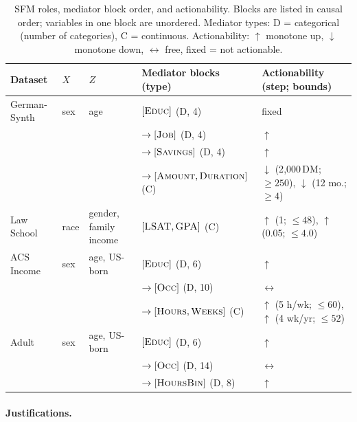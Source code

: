 \begin{table}[t]
\centering
\small
\caption{SFM roles, mediator block order, and actionability. Blocks are
listed in causal order; variables in one block are unordered. Mediator types:
D = categorical (number of categories), C = continuous. Actionability:
$\uparrow$ monotone up, $\downarrow$ monotone down, $\leftrightarrow$ free,
fixed = not actionable.}
\label{tab:roles}
\begin{tabular}{lllll}
\hline
Dataset & $X$ & $Z$ & Mediator blocks (type) & Actionability (step; bounds) \\
\hline
German-Synth & sex & age &
  $[\textsc{Educ}]$ (D, 4) & fixed \\
& & & $\to[\textsc{Job}]$ (D, 4) & $\uparrow$ \\
& & & $\to[\textsc{Savings}]$ (D, 4) & $\uparrow$ \\
& & & $\to[\textsc{Amount},\textsc{Duration}]$ (C) &
  $\downarrow$ (2{,}000\,DM; $\ge250$), $\downarrow$ (12 mo.; $\ge4$) \\
\hline
Law School & race & gender, family income &
  $[\textsc{LSAT},\textsc{GPA}]$ (C) & $\uparrow$ (1; $\le48$), $\uparrow$ (0.05; $\le4.0$) \\
\hline
ACS Income & sex & age, US-born &
  $[\textsc{Educ}]$ (D, 6) & $\uparrow$ \\
& & & $\to[\textsc{Occ}]$ (D, 10) & $\leftrightarrow$ \\
& & & $\to[\textsc{Hours},\textsc{Weeks}]$ (C) &
  $\uparrow$ (5 h/wk; $\le60$), $\uparrow$ (4 wk/yr; $\le52$) \\
\hline
Adult & sex & age, US-born &
  $[\textsc{Educ}]$ (D, 6) & $\uparrow$ \\
& & & $\to[\textsc{Occ}]$ (D, 14) & $\leftrightarrow$ \\
& & & $\to[\textsc{HoursBin}]$ (D, 8) & $\uparrow$ \\
\hline
\end{tabular}
\end{table}

\paragraph{Justifications.}
